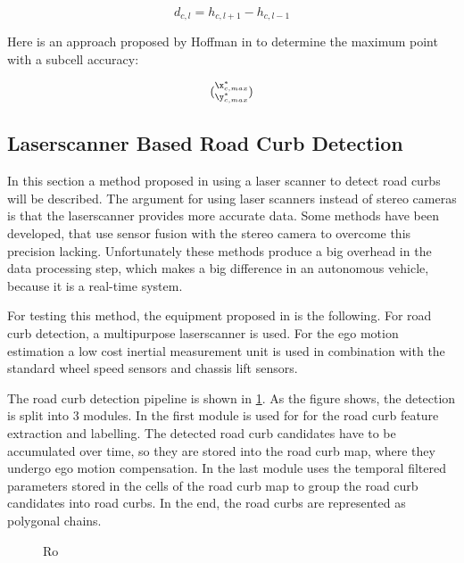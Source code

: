 \documentclass[conference]{IEEEtran}
\begin{document}
\begin{equation}
d_{c,l} = h_{c,l + 1} - h_{c,l -1}
\label{eq2}
\end{equation}

 Here is an approach proposed by Hoffman in \cite{hoffmann} to determine the maximum point with a subcell accuracy:
 
 \begin{equation}
 \label{eq3}
(\substack{\x^{*}_{c,max} \\ \y^{*}_{c,max}}) 
 \end{equation}

\subsection{Laserscanner Based Road Curb Detection}

In this section a method proposed in \cite{stereo} using a laser scanner to detect road curbs will be described. The argument for using laser scanners instead of stereo cameras is that the laserscanner provides more accurate data. Some methods have been developed, that use sensor fusion with the stereo camera to overcome this precision lacking. Unfortunately these methods produce a big overhead in the data processing step, which makes a big difference in an autonomous vehicle, because it is a real-time system.

For testing this method, the equipment proposed in \cite{stereo} is the following. For road curb detection, a multipurpose laserscanner is used. For the ego motion estimation a low cost inertial measurement unit is used in combination with the standard wheel speed sensors and chassis lift sensors. 

The road curb detection pipeline is shown in \ref{fig1}. As the figure shows, the detection is split into 3 modules. In the first module is used for for the road curb feature extraction and labelling. The detected road curb candidates have to be accumulated over time, so they are stored into the road curb map, where they undergo ego motion compensation. In the last module uses the temporal filtered parameters stored in the cells of the road curb map to group the road curb candidates into road curbs. In the end, the road curbs are represented as polygonal chains.  

\begin{figure}[ht]
	\centering
	\caption{Ro}
	\label{fig1}
\end{figure}
  
\end{document}
